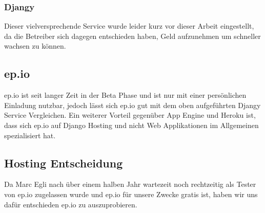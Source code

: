 \subsubsection{Djangy} %
\label{ssub:Djangy}
Dieser vielversprechende Service wurde leider kurz vor dieser Arbeit eingestellt, da die Betreiber sich dagegen entschieden haben, Geld aufzunehmen um schneller wachsen zu können.

\subsection{ep.io} %
\label{sub:ep.io}
ep.io ist seit langer Zeit in der Beta Phase und ist nur mit einer persönlichen Einladung nutzbar, jedoch lässt sich ep.io gut mit dem oben aufgeführten Djangy Service Vergleichen. Ein weiterer Vorteil gegenüber App Engine und Heroku ist, dass sich ep.io auf Django Hosting und nicht Web Applikationen im Allgemeinen spezialisiert hat.


\subsection{Hosting Entscheidung} %
\label{sub:Hosting Entscheidung}
Da Marc Egli nach über einem halben Jahr wartezeit noch rechtzeitig als Tester von ep.io zugelassen wurde und ep.io für unsere Zwecke gratis ist, haben wir uns dafür entschieden ep.io zu auszuprobieren.
